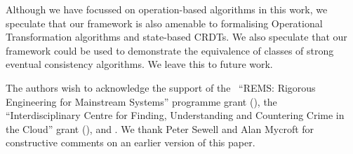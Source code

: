 \documentclass[acmlarge,review,anonymous]{acmart}
\begin{document}
Although we have focussed on operation-based algorithms in this work, we speculate that our framework is also amenable to formalising Operational Transformation algorithms and state-based CRDTs.
We also speculate that our framework could be used to demonstrate the equivalence of classes of strong eventual consistency algorithms.
We leave this to future work.

\begin{acks}
    The authors wish to acknowledge the support of the~ ``REMS: Rigorous Engineering for Mainstream Systems'' programme grant (),
    the~ ``Interdisciplinary Centre for Finding, Understanding and Countering Crime in the Cloud'' grant (),
    and .
    We thank Peter Sewell and Alan Mycroft for constructive comments on an earlier version of this paper.
\end{acks}

\pagebreak

{}
\end{document}
